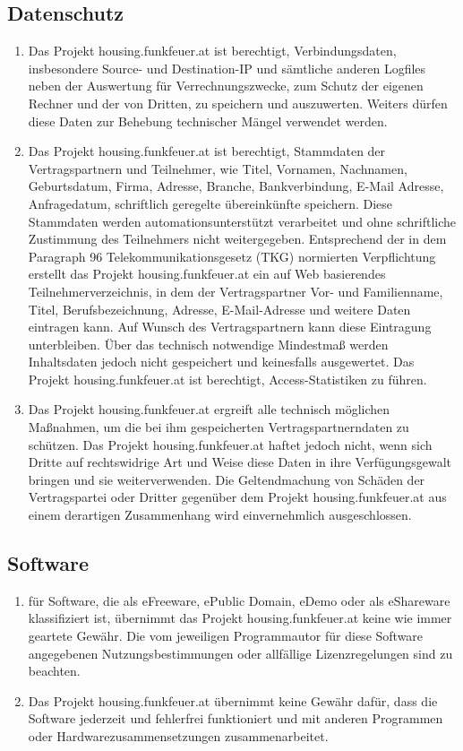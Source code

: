 \documentclass[parskip=half]{article}
\begin{document}
\subsection{Datenschutz}
\begin{enumerate}
\item Das Projekt housing.funkfeuer.at ist berechtigt, Verbindungsdaten, insbesondere Source-
und Destination-IP und sämtliche anderen Logfiles neben der Auswertung für
Verrechnungszwecke, zum Schutz der eigenen Rechner und der von Dritten, zu speichern
und auszuwerten. Weiters dürfen diese Daten zur Behebung technischer Mängel
verwendet werden.
\item Das Projekt housing.funkfeuer.at ist berechtigt, Stammdaten der Vertragspartnern und
Teilnehmer, wie Titel, Vornamen, Nachnamen, Geburtsdatum, Firma, Adresse, Branche,
Bankverbindung, E-Mail Adresse, Anfragedatum, schriftlich geregelte übereinkünfte
speichern. Diese Stammdaten werden automationsunterstützt verarbeitet und ohne
schriftliche Zustimmung des Teilnehmers nicht weitergegeben. Entsprechend der in dem
Paragraph 96 Telekommunikationsgesetz (TKG) normierten Verpflichtung erstellt das
Projekt housing.funkfeuer.at ein auf Web basierendes Teilnehmerverzeichnis, in dem der
Vertragspartner Vor- und Familienname, Titel, Berufsbezeichnung, Adresse, E-Mail-Adresse
und weitere Daten eintragen kann. Auf Wunsch des Vertragspartnern kann diese
Eintragung unterbleiben. Über das technisch notwendige Mindestmaß werden
Inhaltsdaten jedoch nicht gespeichert und keinesfalls ausgewertet. Das Projekt
housing.funkfeuer.at ist berechtigt, Access-Statistiken zu führen.
\item Das Projekt housing.funkfeuer.at ergreift alle technisch möglichen Maßnahmen, um die
bei ihm gespeicherten Vertragspartnerndaten zu schützen. Das Projekt
housing.funkfeuer.at haftet jedoch nicht, wenn sich Dritte auf rechtswidrige Art und Weise
diese Daten in ihre Verfügungsgewalt bringen und sie weiterverwenden. Die
Geltendmachung von Schäden der Vertragspartei oder Dritter gegenüber dem Projekt
housing.funkfeuer.at aus einem derartigen Zusammenhang wird einvernehmlich
ausgeschlossen.
\end{enumerate}

\subsection{Software}
\begin{enumerate}
\item für Software, die als eFreeware, ePublic Domain, eDemo oder als eShareware
klassifiziert ist, übernimmt das Projekt housing.funkfeuer.at keine wie immer geartete
Gewähr. Die vom jeweiligen Programmautor für diese Software angegebenen
Nutzungsbestimmungen oder allfällige Lizenzregelungen sind zu beachten.
\item Das Projekt housing.funkfeuer.at übernimmt keine Gewähr dafür, dass die Software
jederzeit und fehlerfrei funktioniert und mit anderen Programmen oder
Hardwarezusammensetzungen zusammenarbeitet.
\end{enumerate}
\end{document}

